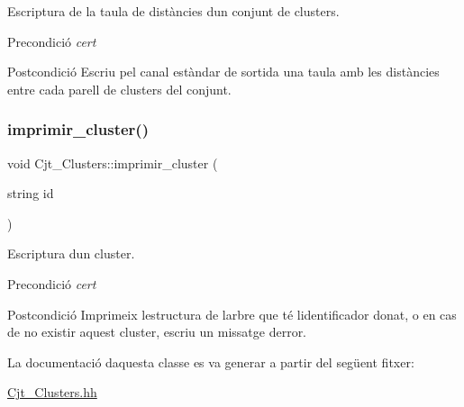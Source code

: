 Escriptura de la taula de distàncies d\textquotesingle{}un conjunt de clusters. 

\begin{DoxyPrecond}{Precondició}
{\itshape cert} 
\end{DoxyPrecond}
\begin{DoxyPostcond}{Postcondició}
Escriu pel canal estàndar de sortida una taula amb les distàncies entre cada parell de clusters del conjunt. 
\end{DoxyPostcond}
\mbox{\label{class_cjt___clusters_a0540284cbc0495cff9ff214a6b4f77a2}} 
\subsubsection{\texorpdfstring{imprimir\+\_\+cluster()}{imprimir\_cluster()}}
{\footnotesize\ttfamily void Cjt\+\_\+\+Clusters\+::imprimir\+\_\+cluster (\begin{DoxyParamCaption}\item[{string}]{id }\end{DoxyParamCaption})}



Escriptura d\textquotesingle{}un cluster. 

\begin{DoxyPrecond}{Precondició}
{\itshape cert} 
\end{DoxyPrecond}
\begin{DoxyPostcond}{Postcondició}
Imprimeix l\textquotesingle{}estructura de l\textquotesingle{}arbre que té l\textquotesingle{}identificador donat, o en cas de no existir aquest cluster, escriu un missatge d\textquotesingle{}error. 
\end{DoxyPostcond}


La documentació d\textquotesingle{}aquesta classe es va generar a partir del següent fitxer\+:\begin{DoxyCompactItemize}
\item 
\hyperlink{_cjt___clusters_8hh}{Cjt\+\_\+\+Clusters.\+hh}\end{DoxyCompactItemize}
